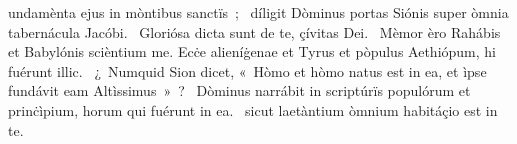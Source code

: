 { }
{%
undamènta ejus in mòntibus sanctïs~; 
~díligit Dòminus portas Siónis super òmnia tabernácula Jacóbi. 
~Gloriósa dicta sunt de te, çívitas Dei. 
~Mèmor èro Rahábis et Babylónis scièntium me. Ecċe alieníġenae et Tyrus et pòpulus Aethiópum, hi fuérunt illic. 
~¿~Numquid Sion dicet, «~Hòmo et hòmo natus est in ea, et ìpse fundávit eam Altìssimus~»~? 
~Dòminus narrábit in scriptúrïs populórum et prinċìpium, horum qui fuérunt in ea. 
~sicut laetàntium òmnium habitáçio est in te. 
}
